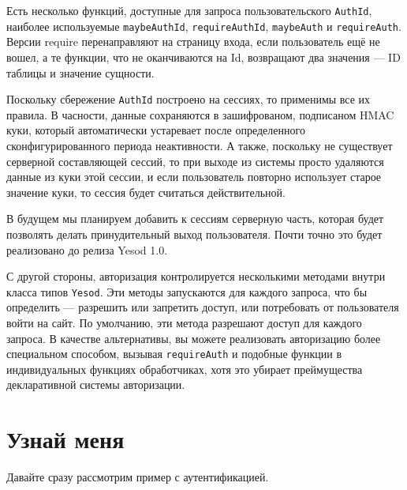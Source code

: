 Есть несколько функций, доступные для запроса пользовательского \lstinline'AuthId', наиболее используемые \lstinline'maybeAuthId', \lstinline'requireAuthId', \lstinline'maybeAuth' и \lstinline'requireAuth'. Версии require перенаправляют на страницу входа, если пользователь ещё не вошел, а те функции, что не оканчиваются на Id, возвращают два значения --- ID таблицы и значение сущности.

Поскольку сбережение \lstinline'AuthId' построено на сессиях, то применимы все их правила. В часности, данные сохраняются в зашифрованом, подписаном HMAC куки, который автоматически устаревает после определенного сконфигурированного периода неактивности. А также, поскольку не существует серверной составляющей сессий, то при выходе из системы просто удаляются данные из куки этой сессии, и если пользователь повторно использует старое значение куки, то сессия будет считаться действительной.

\begin{remark}
В будущем мы планируем добавить к сессиям серверную часть, которая будет позволять делать принудительный выход пользователя. Почти точно это будет реализовано до релиза Yesod 1.0.
\end{remark}

С другой стороны, авторизация контролируется несколькими методами внутри класса типов \lstinline'Yesod'. Эти методы запускаются для каждого запроса, что бы определить --- разрешить или запретить доступ, или потребовать от пользователя войти на сайт. По умолчанию, эти метода разрешают доступ для каждого запроса. В качестве альтернативы, вы можете реализовать авторизацию более специальном способом, вызывая \lstinline'requireAuth' и подобные функции в индивидуальных функциях обработчиках, хотя это убирает преймущества декларативной системы авторизации.

\section{Узнай меня}

Давайте сразу рассмотрим пример с аутентификацией.

